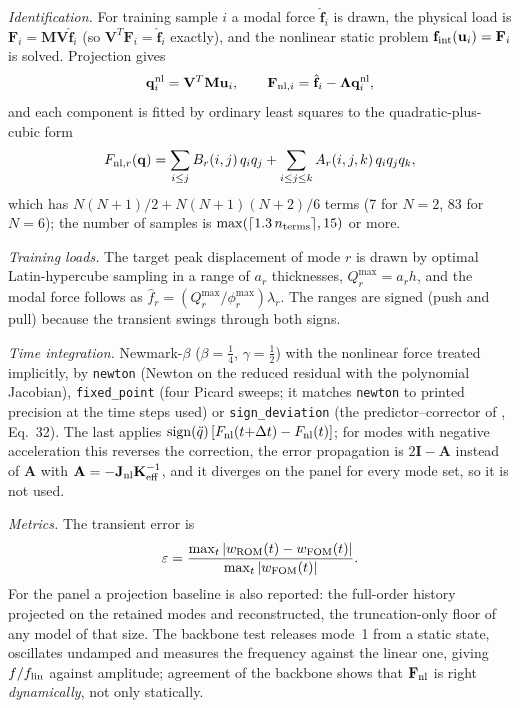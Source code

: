 \emph{Identification.} For training sample $i$ a modal force $\hat{\mathbf f}_i$ is drawn, the physical load is $\mathbf F_i=\mathbf M\mathbf V\hat{\mathbf f}_i$ (so $\mathbf V^{T}\mathbf F_i=\hat{\mathbf f}_i$ exactly), and the nonlinear static problem $\mathbf f_{\rm int}(\mathbf u_i)=\mathbf F_i$ is solved. Projection gives
\begin{equation}\label{eq:hy-id}
\mathbf q_i^{\rm nl}=\mathbf V^{T}\mathbf M\mathbf u_i,\qquad\mathbf F_{{\rm nl},i}=\hat{\mathbf f}_i-\boldsymbol\Lambda\mathbf q_i^{\rm nl},
\end{equation}
and each component is fitted by ordinary least squares to the quadratic-plus-cubic form
\begin{equation}\label{eq:hy-nash}
F_{{\rm nl},r}(\mathbf q)=\sum_{i\le j}B_r(i,j)\,q_iq_j+\sum_{i\le j\le k}A_r(i,j,k)\,q_iq_jq_k,
\end{equation}
which has $N(N+1)/2+N(N+1)(N+2)/6$ terms (7 for $N=2$, 83 for $N=6$); the number of samples is $\max(\lceil1.3\,n_{\rm terms}\rceil,15)$ or more.

\emph{Training loads.} The target peak displacement of mode $r$ is drawn by optimal Latin-hypercube sampling in a range of $a_r$ thicknesses, $Q^{\max}_r=a_rh$, and the modal force follows as $\hat f_r=(Q_r^{\max}/\phi_r^{\max})\lambda_r$. The ranges are signed (push and pull) because the transient swings through both signs.

\emph{Time integration.} Newmark-$\beta$ ($\beta=\tfrac14$, $\gamma=\tfrac12$) with the nonlinear force treated implicitly, by \texttt{newton} (Newton on the reduced residual with the polynomial Jacobian), \texttt{fixed\_point} (four Picard sweeps; it matches \texttt{newton} to printed precision at the time steps used) or \texttt{sign\_deviation} (the predictor--corrector of \citet{he2023mfsnlrom}, Eq.~32). The last applies $\operatorname{sign}(\ddot q)\,[F_{\rm nl}(t{+}\Delta t)-F_{\rm nl}(t)]$; for modes with negative acceleration this reverses the correction, the error propagation is $2\mathbf I-\mathbf A$ instead of $\mathbf A$ with $\mathbf A=-\mathbf J_{\rm nl}\mathbf K_{\rm eff}^{-1}$, and it diverges on the panel for every mode set, so it is not used.

\emph{Metrics.} The transient error is
\begin{equation}\label{eq:hy-err}
\varepsilon=\frac{\max_t|w_{\rm ROM}(t)-w_{\rm FOM}(t)|}{\max_t|w_{\rm FOM}(t)|}.
\end{equation}
For the panel a projection baseline is also reported: the full-order history projected on the retained modes and reconstructed, the truncation-only floor of any model of that size. The backbone test releases mode~1 from a static state, oscillates undamped and measures the frequency against the linear one, giving $f/f_{\rm lin}$ against amplitude; agreement of the backbone shows that $\mathbf F_{\rm nl}$ is right \emph{dynamically}, not only statically.

